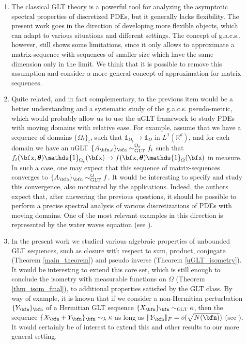 \documentclass{amsart}
\newcommand{\bftheta}{{\boldsymbol\theta}}
\begin{document}
\begin{enumerate}
    \item[(c)] The classical GLT theory is a powerful tool for analyzing the asymptotic spectral properties of discretized PDEs, but it generally lacks flexibility. The present work goes in the direction of developing more flexible objects, which can adapt to various situations and different settings. The concept of g.a.c.s., however, still shows some limitations, since it only allows to approximate a matrix-sequence with sequences of smaller size which have the same dimension only in the limit. We think that it is possible to remove this assumption and consider a more general concept of approximation for matrix-sequences.
    \item[(d)] Quite related, and in fact complementary, to the previous item would be a better understanding and a systematic study of the g.a.c.s. pseudo-metric, which would probably allow us to use the uGLT framework to study PDEs with moving domains with relative ease. For example, assume that we have a sequence of domains $\{\Omega_t\}_t$, such that $\mathds{1}_{\Omega_t}\to\mathds{1}_{\Omega}$ in $L^1(\mathbb{R}^d)$, and for each domain we have an uGLT $ \{A_{\bfn,t}\}_\bfn\sim_{\mathrm{GLT}}^{\Omega_t}f_t$ such that $f_t(\bfx,\bftheta)\mathds{1}_{\Omega_t}(\bfx)\to f(\bfx,\bftheta)\mathds{1}_{\Omega}(\bfx)$ in measure. In such a case, one may expect that this sequence of matrix-sequences converges to $\{A_\bfn\}_\bfn\sim_{\mathrm{GLT}}^{\Omega}f$. It would be interesting to specify and study this convergence, also motivated by the applications. Indeed, the authors expect that, after answering the previous questions, it should be possible to perform a precise spectral analysis of various discretizations of PDEs with moving domains. One of the most relevant examples in this direction is represented by the water waves equation (see \cite{L13}).
    \item[(e)] In the present work we studied various algebraic properties of unbounded GLT sequences, such as closure with respect to sum, product, conjugate (Theorem \ref{main_theorem}) and pseudo inverse (Theorem \ref{uGLT_isometry}). It would be interesting to extend this core set, which is still enough to conclude the isometry with measurable functions on $\Omega$ (Theorem \ref{thm_isom_final}), to additional properties satisfied by the GLT class. By way of example, it is known that if we consider a non-Hermitian perturbation $\{Y_{\bfn}\}_{\bfn}$ of a Hermitian GLT sequence $\{X_{\bfn}\}_{\bfn}\sim_{\text{GLT}}\kappa$, then the sequence $\{X_{\bfn}+Y_{\bfn}\}_{\bfn}\sim_{\lambda} \kappa$ as long as $\|Y_{\bfn}\|_{F} = o(\sqrt{N(\bfn)})$ (see \cite{non-herm}). It would certainly be of interest to extend this and other results to our more general setting. 

\end{enumerate}
\end{document}
